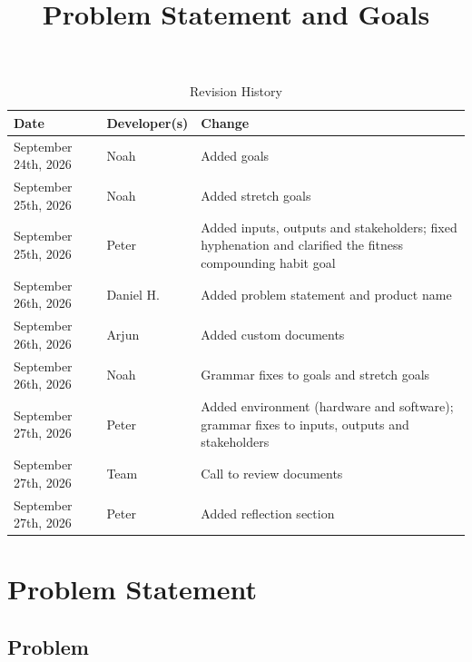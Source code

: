 \documentclass{article}
\title{Problem Statement and Goals\\\progname}
\author{\authname}
\date{}
\begin{document}
\maketitle

\begin{table}[hp]
\caption{Revision History} \label{TblRevisionHistory}
\begin{tabularx}{\textwidth}{llX}
\toprule
\textbf{Date} & \textbf{Developer(s)} & \textbf{Change}\\
\midrule
September 24th, 2026 & Noah & Added goals\\
September 25th, 2026 & Noah & Added stretch goals\\
September 25th, 2026 & Peter & Added inputs, outputs and stakeholders; fixed hyphenation and clarified the fitness compounding habit goal\\
September 26th, 2026 & Daniel H. & Added problem statement and product name\\
September 26th, 2026 & Arjun & Added custom documents\\
September 26th, 2026 & Noah & Grammar fixes to goals and stretch goals\\
September 27th, 2026 & Peter & Added environment (hardware and software); grammar fixes to inputs, outputs and stakeholders\\
September 27th, 2026 & Team & Call to review documents\\
September 27th, 2026 & Peter & Added reflection section\\
\bottomrule
\end{tabularx}
\end{table}

\section{Problem Statement}



\subsection{Problem}

\end{document}
